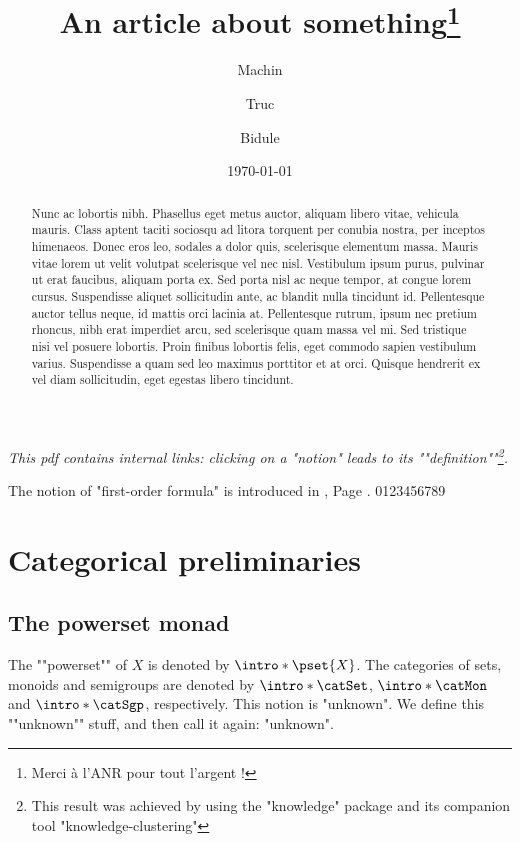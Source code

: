 \documentclass{fancy-article}
\title{An article about something\thanks{Merci à l'ANR pour tout l'argent !}}
\author[1]{Machin}
\author[2]{Truc}
\author[1]{Bidule}
\affil[1]{Institut du Fromage}
\affil[2]{Baguette Université Sorbonne-Est}
\date{\today}
\begin{document}
\maketitle

\begin{abstract}
  Nunc ac lobortis nibh. Phasellus eget metus auctor, aliquam libero vitae, vehicula mauris. Class aptent taciti sociosqu ad litora torquent per conubia nostra, per inceptos himenaeos. Donec eros leo, sodales a dolor quis, scelerisque elementum massa. Mauris vitae lorem ut velit volutpat scelerisque vel nec nisl. Vestibulum ipsum purus, pulvinar ut erat faucibus, aliquam porta ex. Sed porta nisl ac neque tempor, at congue lorem cursus. Suspendisse aliquet sollicitudin ante, ac blandit nulla tincidunt id. Pellentesque auctor tellus neque, id mattis orci lacinia at. Pellentesque rutrum, ipsum nec pretium rhoncus, nibh erat imperdiet arcu, sed scelerisque quam massa vel mi. Sed tristique nisi vel posuere lobortis. Proin finibus lobortis felis, eget commodo sapien vestibulum varius. Suspendisse a quam sed leo maximus porttitor et at orci. Quisque hendrerit ex vel diam sollicitudin, eget egestas libero tincidunt. 
\end{abstract}

\AP\emph{%
This pdf contains internal links: clicking on a "notion" leads to its
""definition""\footnote{This result was achieved by using the "knowledge" package
and its companion tool "knowledge-clustering"}.
}

The notion of "first-order formula" is introduced in
, Page .
0123456789

\section{Categorical preliminaries}
 
\subsection{The powerset monad}

\AP The ""powerset"" of $X$ is denoted by $\intro*\pset{X}$. The categories
of sets, monoids and semigroups are denoted by $\intro*\catSet$,
$\intro*\catMon$ and $\intro*\catSgp$, respectively.
This notion is "unknown". We define this ""unknown"" stuff, and then call it again: "unknown".
\end{document}
